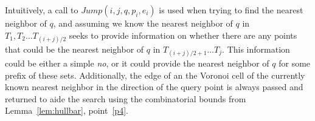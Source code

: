 \documentclass[10pt,a4paper]{amsart}
\newcommand{\ovar}[1]{\overrightarrow{#1}}
\newcommand{\Cell}{\mathit{Cell}}
\newcommand{\NN}{\mathit{NN}}
\newcommand{\john}[1]{\textcolor{red}{#1}}
\newcommand{\yakov}[1]{\textcolor{blue}{Yakov: #1}}
\begin{document}
Intuitively, a call to $Jump(i,j,q,p_i,e_i)$ is used when trying to find the nearest neighbor of $q$, and assuming we know the nearest neighbor of $q$ in $T_1, T_2 \ldots T_{(i+j)/2}$ seeks to provide information on whether there are any points that could be the nearest neighbor of $q$ in $T_{(i+j)/2+1} \ldots T_j$. This information could be either a simple \emph{no}, or it could provide the nearest neighbor of $q$ for some prefix of these sets. Additionally, the edge of an the Voronoi cell of the currently known nearest neighbor in the direction of the query point is always passed and returned to aide the search using the combinatorial bounds from Lemma~\ref{lem:hullbar}, point~\ref{p4}.
 
\newcommand{\jumpdef}{
\begin{itemize}
\setlength{\itemsep}{1pt}
\setlength{\parskip}{0pt}
\setlength{\parsep}{0pt} 
    \item \textbf{Input to $Jump(i,j,q,p_i,e_i)$}:
        \begin{itemize}
        \setlength{\itemsep}{1pt}
     \setlength{\parskip}{0pt}
    \setlength{\parsep}{0pt} 
        \item Integers $i$ and $j$, where $j-i$ is required to be a power of 2. We use $m$ to refer to $(j+i)/2$, the midpoint.  
        \item Query point $q$.
        \item Point $p_i$ where $p_i = \NN(T_i,q)$.
        \item The edge $e_i$ on the boundary of $\Cell(T_i,p_i)$ that the ray $\ovar{p_iq}$ intersects.
  \end{itemize}
    \item \textbf{Output}: Either one of two results, \emph{Failure} or a triple $(j',p_{j'},e_{j'})$
	\begin{itemize}
		\item If \emph{Failure}, this is a certificate that $\NN_{(m,\min(j,f)]}(q) \not = \NN_{[1,\min(j,f)]}(q)$
		\item If a triple $(j',p_{j'},e_{j'})$ is returned, it has the following properties:
    \begin{itemize}

\end{itemize}
\end{itemize}
\end{itemize}}
\end{document}
